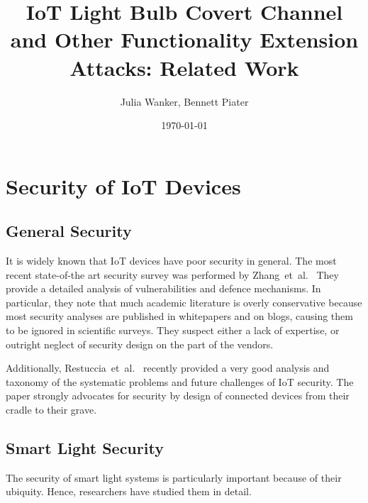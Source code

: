 \documentclass[11pt,a4paper]{article}
\begin{document}
	\title{IoT Light Bulb Covert Channel and Other Functionality Extension Attacks: Related Work}
	\author{Julia Wanker, Bennett Piater}
	\date{\today}
	\maketitle

	\section{Security of IoT Devices}%
	\label{sec:security_of_iot_devices}

	\subsection{General Security}%
	\label{sub:general_security}


  It is widely known that IoT devices have poor security in general.
	The most recent state-of-the art security survey was performed by
	Zhang~et~al.~\cite{Zhang:2017:UISTDCBWWNaWWG} %
	They provide a detailed analysis of vulnerabilities and defence mechanisms.
	In particular, they note that much academic literature is overly conservative because most security analyses are published in whitepapers and on blogs, causing them to be ignored in scientific surveys.
	They suspect either a lack of expertise, or outright neglect of security design on the part of the vendors.

	Additionally,
	Restuccia~et~al.~\cite{Restuccia:2018:SITNPaRC} %
	recently provided a very good analysis and taxonomy of the systematic problems and future challenges of IoT security. The paper strongly advocates for security by design of connected devices from their cradle to their grave.

	\subsection{Smart Light Security}%
	\label{sub:smart_light_security}
	The security of smart light systems is particularly important because of their ubiquity. Hence, researchers have studied them in detail.
\end{document}
